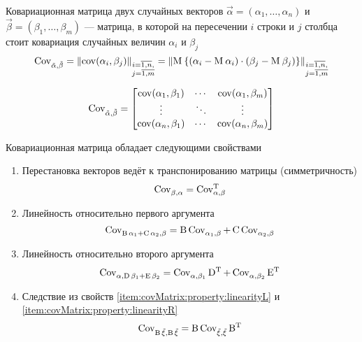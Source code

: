 \begin{definition}\label{def:covMatrix}
  Ковариационная матрица двух случайных векторов
  $\vec{\alpha} = \left( \alpha_1, \dots, \alpha_n \right)$ и
  $\vec{\beta} = \left( \beta_1, \dots, \beta_m \right)$ --- матрица,
  в которой на пересечении $i$ строки и $j$ столбца стоит ковариация случайных
  величин $\alpha_i$ и $\beta_j$
  $$\operatorname{Cov^{}_{\vec{\alpha}, \vec{\beta}}}
      = \left\| \operatorname{cov}\!\left( \alpha_i, \beta_j \right) \right\|_{
      \substack{i=\overline{1,n},\\j=\overline{1,m}}}
      = \left\| \operatorname{M}_{} 
      \left\{ \left( \alpha_i - \operatorname{M}_{} \alpha_i \right)
          \cdot \left( \beta_j - \operatorname{M}_{} \beta_j \right)
      \right\} \right\|_{
          \substack{i=\overline{1,n},\\j=\overline{1,m}}}$$

  $$\operatorname{Cov^{}_{\vec{\alpha}, \vec{\beta}}} =
  \begin{bmatrix}
      \operatorname{cov}\!\left( \alpha_1, \beta_1 \right) & \cdots & \operatorname{cov}\!\left( \alpha_1, \beta_m \right) \\
      \vdots & \ddots & \vdots \\
      \operatorname{cov}\!\left( \alpha_n, \beta_1 \right) & \cdots & \operatorname{cov}\!\left( \alpha_n, \beta_m \right)
  \end{bmatrix}$$
\end{definition}

Ковариационная матрица обладает следующими свойствами
\begin{enumerate}
  \item\label{item:covMatrix:property:transposition}
      Перестановка векторов ведёт к транспонированию матрицы (симметричность)
      $$\operatorname{Cov^{}_{\beta, \alpha}} = \operatorname{Cov^{T}_{\alpha, \beta}}$$
  \item\label{item:covMatrix:property:linearityL}
      Линейность относительно первого аргумента
      $$\operatorname{Cov^{}_{\operatorname{B} \alpha_1 + \operatorname{C} \alpha_2, \beta}}
      = \operatorname{B} \operatorname{Cov^{}_{\alpha_1, \beta}}
          + \operatorname{C}\operatorname{Cov^{}_{\alpha_2, \beta}}$$
  \item\label{item:covMatrix:property:linearityR}
      Линейность относительно второго аргумента
      $$\operatorname{Cov^{}_{\alpha, \operatorname{D} \beta_1 + \operatorname{E} \beta_2}}
      = \operatorname{Cov^{}_{\alpha, \beta_1}} \operatorname{D^T}
          + \operatorname{Cov^{}_{\alpha, \beta_2}} \operatorname{E^T}$$
  \item\label{item:covMatrix:property:operatorOut}
      Следствие из свойств \ref{item:covMatrix:property:linearityL} и
      \ref{item:covMatrix:property:linearityR}
      $$\operatorname{Cov^{}_{\operatorname{B} \vec{\xi}, \operatorname{B} \vec{\xi}}}
      = \operatorname{B} \operatorname{Cov^{}_{\vec{\xi}, \vec{\xi}}} \operatorname{B^T}$$
\end{enumerate}



